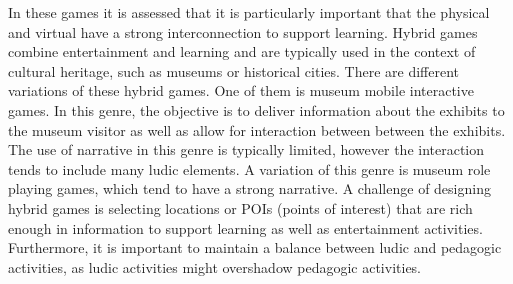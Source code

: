 In these games it is assessed that it is particularly important
that the physical and virtual have a strong interconnection to
support learning.
Hybrid games combine entertainment and learning and are
typically used in the context of cultural heritage, such as museums
or historical cities. There are different variations of
these hybrid games. One of them is museum mobile interactive
games. In this genre, the objective is to deliver information
about the exhibits to the museum visitor as well as
allow for interaction between between the exhibits. The use
of narrative in this genre is typically limited, however the interaction
tends to include many ludic elements. A variation of
this genre is museum role playing games, which tend to have
a strong narrative. A challenge of designing hybrid games is
selecting locations or POIs (points of interest) that are rich
enough in information to support learning as well as entertainment
activities. Furthermore, it is important to maintain a balance between ludic and pedagogic activities, as ludic activities
might overshadow pedagogic activities.